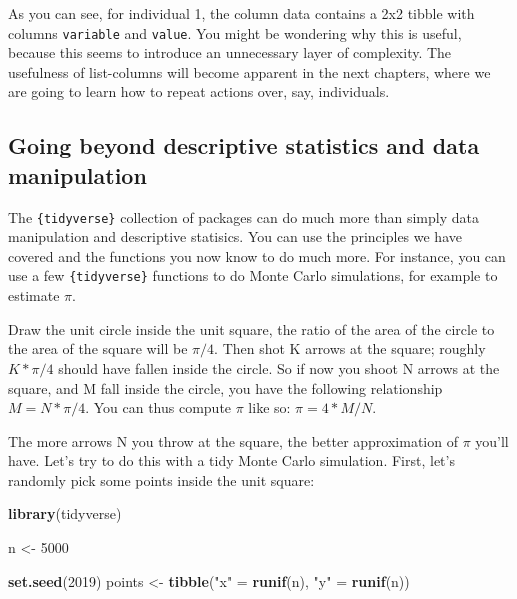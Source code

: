\documentclass[]{gitbook}
\newenvironment{Shaded}{\begin{snugshade}}{\end{snugshade}}
\newcommand{\DecValTok}[1]{\textcolor[rgb]{0.00,0.00,0.81}{#1}}
\newcommand{\KeywordTok}[1]{\textcolor[rgb]{0.13,0.29,0.53}{\textbf{#1}}}
\newcommand{\NormalTok}[1]{#1}
\newcommand{\StringTok}[1]{\textcolor[rgb]{0.31,0.60,0.02}{#1}}
\begin{document}
As you can see, for individual 1, the column data contains a 2x2 tibble with columns \texttt{variable} and
\texttt{value}. You might be wondering why this is useful, because this seems to introduce an unnecessary
layer of complexity. The usefulness of list-columns will become apparent in the next chapters,
where we are going to learn how to repeat actions over, say, individuals.

\hypertarget{going-beyond-descriptive-statistics-and-data-manipulation}{%
\subsection{Going beyond descriptive statistics and data manipulation}\label{going-beyond-descriptive-statistics-and-data-manipulation}}

The \texttt{\{tidyverse\}} collection of packages can do much more than simply data manipulation and
descriptive statisics. You can use the principles we have covered and the functions you now know
to do much more. For instance, you can use a few \texttt{\{tidyverse\}} functions to do Monte Carlo simulations,
for example to estimate \(\pi\).

Draw the unit circle inside the unit square, the ratio of the area of the circle to the area of the
square will be \(\pi/4\). Then shot K arrows at the square; roughly \(K*\pi/4\) should have fallen
inside the circle. So if now you shoot N arrows at the square, and M fall inside the circle, you have
the following relationship \(M = N*\pi/4\). You can thus compute \(\pi\) like so: \(\pi = 4*M/N\).

The more arrows N you throw at the square, the better approximation of \(\pi\) you'll have. Let's
try to do this with a tidy Monte Carlo simulation. First, let's randomly pick some points inside
the unit square:

\begin{Shaded}
\begin{Highlighting}[]
\KeywordTok{library}\NormalTok{(tidyverse)}

\NormalTok{n <-}\StringTok{ }\DecValTok{5000}

\KeywordTok{set.seed}\NormalTok{(}\DecValTok{2019}\NormalTok{)}
\NormalTok{points <-}\StringTok{ }\KeywordTok{tibble}\NormalTok{(}\StringTok{"x"}\NormalTok{ =}\StringTok{ }\KeywordTok{runif}\NormalTok{(n), }\StringTok{"y"}\NormalTok{ =}\StringTok{ }\KeywordTok{runif}\NormalTok{(n))}
\end{Highlighting}
\end{Shaded}
\end{document}
